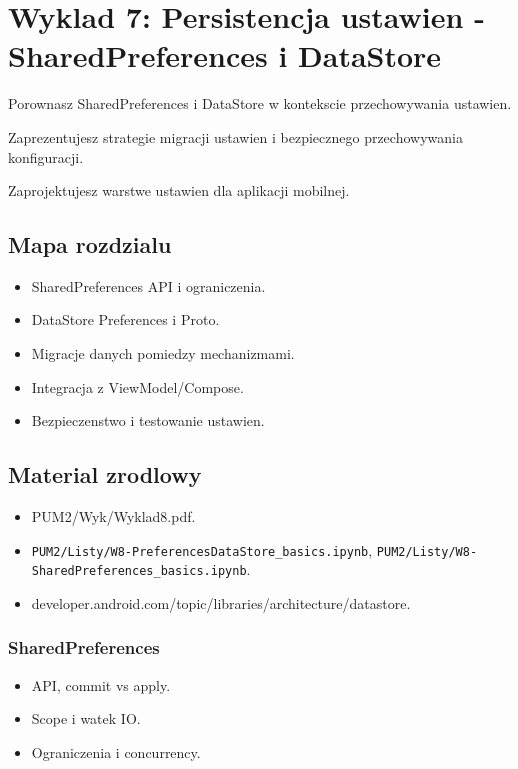 \chapter{Wyklad 7: Persistencja ustawien - SharedPreferences i DataStore}

\begin{learningobjectives}
  \item Porownasz SharedPreferences i DataStore w kontekscie przechowywania ustawien.
  \item Zaprezentujesz strategie migracji ustawien i bezpiecznego przechowywania konfiguracji.
  \item Zaprojektujesz warstwe ustawien dla aplikacji mobilnej. 
\end{learningobjectives}

\section{Mapa rozdzialu}
\begin{itemize}
  \item SharedPreferences API i ograniczenia.
  \item DataStore Preferences i Proto.
  \item Migracje danych pomiedzy mechanizmami.
  \item Integracja z ViewModel/Compose.
  \item Bezpieczenstwo i testowanie ustawien.
\end{itemize}

\section{Material zrodlowy}
\begin{itemize}
  \item PUM2/Wyk/Wyklad8.pdf.
  \item \texttt{PUM2/Listy/W8-PreferencesDataStore\_basics.ipynb}, \texttt{PUM2/Listy/W8-SharedPreferences\_basics.ipynb}.
  \item developer.android.com/topic/libraries/architecture/datastore.
\end{itemize}

\subsection{SharedPreferences}
\begin{itemize}
  \item API, commit vs apply.
  \item Scope i watek IO.
  \item Ograniczenia i concurrency.
\end{itemize}

